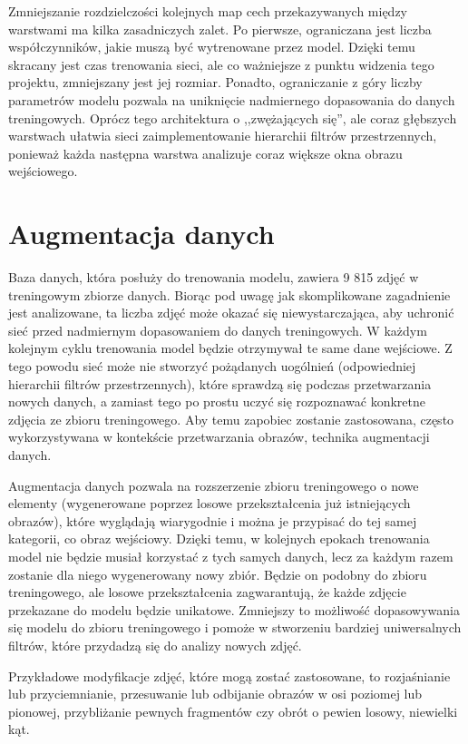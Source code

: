 Zmniejszanie rozdzielczości kolejnych map cech przekazywanych między warstwami ma kilka zasadniczych zalet. Po pierwsze, ograniczana jest liczba współczynników, jakie muszą być wytrenowane przez model. Dzięki temu skracany jest czas trenowania sieci, ale co ważniejsze z punktu widzenia tego projektu, zmniejszany jest jej rozmiar. Ponadto, ograniczanie z góry liczby parametrów modelu pozwala na uniknięcie nadmiernego dopasowania do danych treningowych. Oprócz tego architektura o ,,zwężających się'', ale coraz głębszych warstwach ułatwia sieci zaimplementowanie hierarchii filtrów przestrzennych, ponieważ każda następna warstwa analizuje coraz większe okna obrazu wejściowego.


\section{Augmentacja danych}
Baza danych, która posłuży do trenowania modelu, zawiera 9 815 zdjęć w treningowym zbiorze danych.
Biorąc pod uwagę jak skomplikowane zagadnienie jest analizowane, ta liczba zdjęć może okazać się niewystarczająca, aby uchronić sieć przed nadmiernym dopasowaniem do danych treningowych. 
W każdym kolejnym cyklu trenowania model będzie otrzymywał te same dane wejściowe.
Z tego powodu sieć może nie stworzyć pożądanych uogólnień (odpowiedniej hierarchii filtrów przestrzennych), które sprawdzą się podczas przetwarzania nowych danych, a zamiast tego po prostu uczyć się rozpoznawać konkretne zdjęcia ze zbioru treningowego.
Aby temu zapobiec zostanie zastosowana, często wykorzystywana w kontekście przetwarzania obrazów, technika augmentacji danych.

Augmentacja danych pozwala na rozszerzenie zbioru treningowego o nowe elementy (wygenerowane poprzez losowe przekształcenia już istniejących obrazów), które wyglądają wiarygodnie i można je przypisać do tej samej kategorii, co obraz wejściowy. Dzięki temu, w kolejnych epokach trenowania model nie będzie musiał korzystać z tych samych danych, lecz za każdym razem zostanie dla niego wygenerowany nowy zbiór. Będzie on podobny do zbioru treningowego, ale losowe przekształcenia zagwarantują, że każde zdjęcie przekazane do modelu będzie unikatowe. Zmniejszy to możliwość dopasowywania się modelu do zbioru treningowego i pomoże w stworzeniu bardziej uniwersalnych filtrów, które przydadzą się do analizy nowych zdjęć.

Przykładowe modyfikacje zdjęć, które mogą zostać zastosowane, to rozjaśnianie lub przyciemnianie, przesuwanie lub odbijanie obrazów w osi poziomej lub pionowej, przybliżanie pewnych fragmentów czy obrót o pewien losowy, niewielki kąt.

